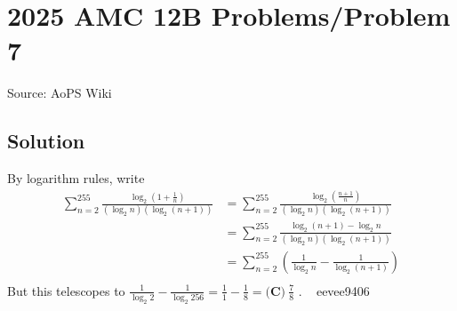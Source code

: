 \documentclass[12pt]{article}
\begin{document}
\section*{{2025 AMC 12B Problems/Problem 7}}
Source: AoPS Wiki

\subsection*{Solution}
By logarithm rules, write
\begin{align}
\sum_{n = 2}^{255}\frac{\log_{2}\left(1 + \tfrac{1}{n}\right)}{\left(\log_{2}n\right)\left(\log_{2}(n + 1)\right)}&=
\sum_{n = 2}^{255}\frac{\log_{2}\left(\tfrac{n+1}{n}\right)}{\left(\log_{2}n\right)\left(\log_{2}(n + 1)\right)}\\
&=\sum_{n = 2}^{255}\frac{\log_{2}(n+1)-\log_{2}n}{\left(\log_{2}n\right)\left(\log_{2}(n + 1)\right)}\\
&=\sum_{n = 2}^{255}\left(\frac{1}{\log_{2}n}-\frac{1}{\log_{2}(n+1)}\right)\\
\end{align} But this telescopes to $\frac{1}{\log_{2}2}-\frac{1}{\log_{2}256}=\frac{1}{1}-\frac{1}{8}=\boxed{\textbf{(C)}~\frac{7}{8}}$ . ~ eevee9406
\end{document}
